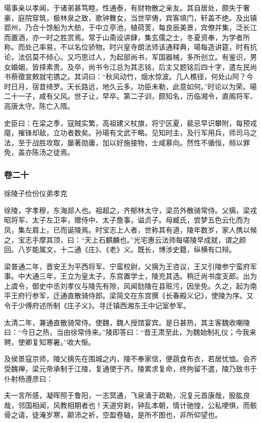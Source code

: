 \documentclass[]{article}
\begin{document}
瑒事亲以孝闻，于诸弟甚笃睦。性通泰，有财物散之亲友。其自居处，颇失于奢豪，庭院穿筑，极林泉之致，歌钟舞女，当世罕俦，宾客填门，轩盖不绝。及出镇郢州，乃合十馀船为大舫，于中立亭池，植荷芰，每良辰美景，宾僚并集，泛长江而置酒，亦一时之胜赏焉。常于山斋设讲肆，集玄儒之士，冬夏资奉，为学者所称。而处己率易，不以名位骄物。时兴皇寺朗法师该通释典，瑒每造讲筵，时有抗论，法侣莫不倾心。又巧思过人，为起部尚书，军国器械，多所创立。有鉴识，男女婚姻，皆择素贵。及卒，尚书令江总为其志铭，后主又题铭后四十字，遣左民尚书蔡徵宣敕就宅镌之。其词曰：``秋风动竹，烟水惊波。几人樵径，何处山阿？今时日月，宿昔绮罗。天长路远，地久云多。功臣未勒，此意如何。''时论以为荣。瑒二十一子，咸有父风。世子让，早卒。第二子训，颇知名，历临湘令，直阁将军、高唐太守。陈亡入隋。

史臣曰：在梁之季，寇贼实繁，高祖建义杖旗，将宁区夏，裴忌早识攀附，每预戎麾，摧锋却敌，立功者数矣。孙瑒有文武干略。见知时主，及行军用兵，师司马之法，至于战胜攻取，屡著勋庸，加以好施接物，士咸慕向。然性不循恒，频以罪免，盖亦陈汤之徒焉。

\hypertarget{header-n4768}{%
\subsubsection{卷二十}\label{header-n4768}}

徐陵子俭份仪弟孝克

徐陵，字孝穆，东海郯人也。祖超之，齐郁林太守，梁员外散骑常侍。父摛，梁戎昭将军、太子左卫率，赠侍中、太子詹事，谥贞子。母臧氏，尝梦五色云化而为凤，集左肩上，已而诞陵焉。时宝志上人者，世称其有道，陵年数岁，家人携以候之，宝志手摩其顶，曰：``天上石麒麟也。''光宅惠云法师每嗟陵早成就，谓之颜回。八岁能属文，十二通《庄》、《老》义。既长，博涉史籍，纵横有口辩。

梁普通二年，晋安王为平西将军、宁蛮校尉，父摛为王咨议，王又引陵参宁蛮府军事。中大通三年，王立为皇太子，东宫置学士，陵充其选。稍迁尚书度支郎。出为上虞令，御史中丞刘孝仪与陵先有隙，风闻劾陵在县赃污，因坐免。久之，起为南平王府行参军，迁通直散骑侍郎。梁简文在东宫撰《长春殿义记》，使陵为序。又令于少傅府述所制《庄子义》。寻迁镇西湘东王中记室参军。

太清二年，兼通直散骑常侍。使魏，魏人授馆宴宾。是日甚热，其主客魏收嘲陵曰：``今日之热，当由徐常侍来。''陵即答曰：``昔王肃至此，为魏始制礼仪；今我来聘，使卿复知寒暑。''收大惭。

及侯景寇京师，陵父摛先在围城之内，陵不奉家信，便蔬食布衣，若居忧恤。会齐受魏禅，梁元帝承制于江陵，复通使于齐。陵累求复命，终拘留不遣，陵乃致书于仆射杨遵彦曰：

夫一言所感，凝晖照于鲁阳，一志冥通，飞泉涌于疏勒，况复元首康哉，股肱良哉，邻国相闻，风教相期者也！天道穷剥，钟乱本朝，情计驰惶，公私哽惧，而骸骨之请，徒淹岁寒，颠沛之祈，空盈卷轴，是所不图也，非所仰望也。
\end{document}
